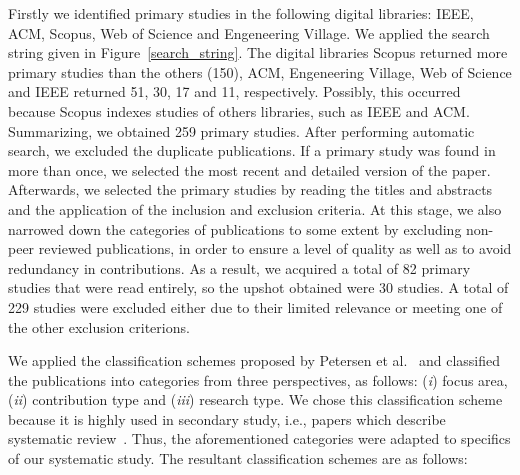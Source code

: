 Firstly we identified primary studies in the following digital libraries: IEEE, ACM, Scopus, Web of Science and Engeneering Village. We applied the search string given in Figure~\ref{search_string}. %
The digital libraries Scopus returned more primary studies than the others (150), ACM, Engeneering Village, Web of Science and IEEE returned 51, 30, 17 and 11, respectively. Possibly, this occurred because Scopus indexes studies of others libraries, such as IEEE and ACM. Summarizing, we obtained 259 primary studies. After performing automatic search, we excluded the duplicate publications. If a primary study was found in more than once, we selected the most recent and detailed version of the paper. Afterwards, we selected the primary studies by reading the titles and abstracts and the application of the inclusion and exclusion criteria. At this stage, we also narrowed down the categories of publications to some extent by excluding non-peer reviewed publications, in order to ensure a level of quality as well as to avoid redundancy in contributions. As a result, we acquired a total of 82 primary studies that were read entirely, so the upshot obtained were 30 studies. A total of 229 studies were excluded either due to their limited relevance or meeting one of the other exclusion criterions.

We applied the classification schemes proposed by Petersen et al.~\cite{Petersen:2008:SMS:2227115.2227123} and classified the publications into categories from three perspectives, as follows: (\textit{i}) focus area, (\textit{ii}) contribution type and (\textit{iii}) research type. We chose this classification scheme because it is highly used in secondary study, i.e., papers which describe systematic review~\cite{Durelli:2013:SRM:2480362.2480567}.%
 Thus, the aforementioned categories were adapted to specifics of our systematic study. The resultant classification schemes are as follows:

